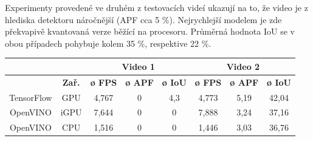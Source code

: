 Experimenty provedené ve druhém z testovacích videí ukazují na to, že video je z hlediska detektoru náročnější (APF cca 5 \%). Nejrychlejší modelem je zde překvapivě kvantovaná verze běžící na procesoru. Průměrná hodnota IoU se v obou případech pohybuje kolem 35 \%, respektive 22 \%.


\begin{table}[H]
  \centering
  \begin{tabular}{cc|ccc|ccc|}
  \cline{3-8}
                                                               &                              & \multicolumn{3}{c|}{\cellcolor[HTML]{CBCEFB}\textbf{Video 1}}                                                                              & \multicolumn{3}{c|}{\cellcolor[HTML]{CBCEFB}\textbf{Video 2}}                                                                              \\ \hline
  \rowcolor[HTML]{E0DBDB} 
  \multicolumn{1}{|c|}{\cellcolor[HTML]{E0DBDB}\textbf{Model}} & \textbf{Zař.}                & \multicolumn{1}{c|}{\cellcolor[HTML]{E0DBDB}\textbf{ø FPS}} & \multicolumn{1}{c|}{\cellcolor[HTML]{E0DBDB}\textbf{ø APF}} & \textbf{ø IoU} & \multicolumn{1}{c|}{\cellcolor[HTML]{E0DBDB}\textbf{ø FPS}} & \multicolumn{1}{c|}{\cellcolor[HTML]{E0DBDB}\textbf{ø APF}} & \textbf{ø IoU} \\ \hline
  \multicolumn{1}{|c|}{\cellcolor[HTML]{E0DBDB}TensorFlow}     & \cellcolor[HTML]{E0DBDB}GPU  & \multicolumn{1}{c|}{4,767}                                  & \multicolumn{1}{c|}{0}                                      & 4,3            & \multicolumn{1}{c|}{4,773}                                  & \multicolumn{1}{c|}{5,19}                                   & 42,04          \\ \hline
  \multicolumn{1}{|c|}{\cellcolor[HTML]{E0DBDB}OpenVINO}       & \cellcolor[HTML]{E0DBDB}iGPU & \multicolumn{1}{c|}{7,644}                                  & \multicolumn{1}{c|}{0}                                      & 0              & \multicolumn{1}{c|}{7,888}                                  & \multicolumn{1}{c|}{3,24}                                   & 37,16          \\ \hline
  \multicolumn{1}{|c|}{\cellcolor[HTML]{E0DBDB}OpenVINO}       & \cellcolor[HTML]{E0DBDB}CPU  & \multicolumn{1}{c|}{1,516}                                  & \multicolumn{1}{c|}{0}                                      & 0              & \multicolumn{1}{c|}{1,446}                                  & \multicolumn{1}{c|}{3,03}                                   & 36,76          \\ \hline

\end{tabular}
\end{table}
